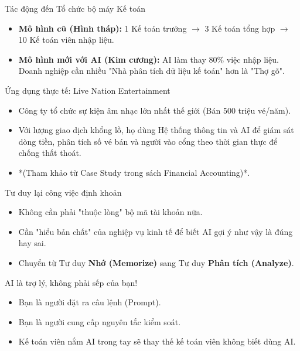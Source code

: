 \documentclass[aspectratio=169]{beamer}
\begin{document}
\begin{frame}{Tác động đến Tổ chức bộ máy Kế toán}
    \begin{itemize}
        \item \textbf{Mô hình cũ (Hình tháp):} 1 Kế toán trưởng $\rightarrow$ 3 Kế toán tổng hợp $\rightarrow$ 10 Kế toán viên nhập liệu.
        \item \textbf{Mô hình mới với AI (Kim cương):} AI làm thay 80\% việc nhập liệu. Doanh nghiệp cần nhiều "Nhà phân tích dữ liệu kế toán" hơn là "Thợ gõ".
    \end{itemize}
\end{frame}


\begin{frame}{Ứng dụng thực tế: Live Nation Entertainment}
    \begin{itemize}
        \item Công ty tổ chức sự kiện âm nhạc lớn nhất thế giới (Bán 500 triệu vé/năm).
        \item Với lượng giao dịch khổng lồ, họ dùng Hệ thống thông tin và AI để giám sát dòng tiền, phân tích số vé bán và người vào cổng theo thời gian thực để chống thất thoát.
        \item *(Tham khảo từ Case Study trong sách Financial Accounting)*.
    \end{itemize}
\end{frame}


\begin{frame}{Tư duy lại công việc định khoản}
    \begin{itemize}
        \item Không cần phải "thuộc lòng" bộ mã tài khoản nữa.
        \item Cần "hiểu bản chất" của nghiệp vụ kinh tế để biết AI gợi ý như vậy là đúng hay sai.
        \item Chuyển từ Tư duy \textbf{Nhớ (Memorize)} sang Tư duy \textbf{Phân tích (Analyze)}.
    \end{itemize}
\end{frame}


\begin{frame}{AI là trợ lý, không phải sếp của bạn!}
    \begin{itemize}
        \item Bạn là người đặt ra câu lệnh (Prompt).
        \item Bạn là người cung cấp nguyên tắc kiểm soát.
        \item Kế toán viên nắm AI trong tay sẽ thay thế kế toán viên không biết dùng AI.
    \end{itemize}
\end{frame}
\end{document}
